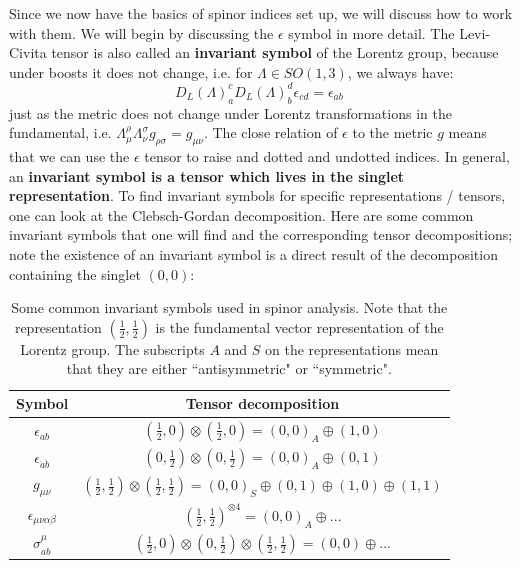 \documentclass[11pt, oneside]{article}   	%
\theoremstyle{definition}
\begin{document}
Since we now have the basics of spinor indices set up, we will discuss how to work with them. We will begin by discussing the $\epsilon$ 
symbol in more detail. The Levi-Civita tensor is also called an \textbf{invariant symbol} of the 
Lorentz group, because under boosts it does not change, i.e. for $\Lambda\in SO(1, 3)$, we always have:
\begin{equation}
	D_L(\Lambda)_a^c D_L(\Lambda)_b^d \epsilon_{cd} = \epsilon_{ab}~
	\label{eq:epsilon_trans}
\end{equation}
just as the metric does not change under Lorentz transformations in the fundamental, i.e. $\Lambda_\mu^\rho\Lambda_\nu^\sigma 
g_{\rho\sigma} = g_{\mu\nu}$. The close relation of $\epsilon$ to the metric $g$ means that we can use the $\epsilon$ tensor to raise and 
dotted and undotted indices. In general, an \textbf{invariant symbol is a tensor which lives in the singlet representation}. To find invariant 
symbols for specific representations / tensors, one can look at the Clebsch-Gordan decomposition. Here are some common invariant symbols 
that one will find and the corresponding tensor decompositions; note the existence of an invariant symbol is a direct result of the 
decomposition containing the singlet $(0, 0)$:
\begin{table}[H]
	\centering
	\begin{tabular}{| c | c | }
		\hline
		Symbol & Tensor decomposition \\
		\hline
		$\epsilon_{ab}$ & $(\frac{1}{2}, 0)\otimes (\frac{1}{2}, 0) = (0, 0)_A\oplus (1, 0)$ \\
		$\epsilon_{\dot a\dot b}$ & $(0, \frac{1}{2})\otimes (0, \frac{1}{2}) = (0, 0)_A\oplus (0, 1)$ \\
		$g_{\mu\nu}$ & $(\frac{1}{2}, \frac{1}{2})\otimes (\frac{1}{2}, \frac{1}{2}) = (0, 0)_S\oplus (0, 1)\oplus (1, 0)\oplus (1, 1)$ \\
		$\epsilon_{\mu\nu\alpha\beta}$ & $(\frac{1}{2}, \frac{1}{2})^{\otimes 4} = (0, 0)_A\oplus ...$ \\
		$\sigma_{a\dot b}^\mu$ & $(\frac{1}{2}, 0)\otimes (0, \frac{1}{2})\otimes (\frac{1}{2}, \frac{1}{2}) = (0, 0)\oplus ...$ \\
		\hline
	\end{tabular}
	\caption{Some common invariant symbols used in spinor analysis. Note that the representation $(\frac{1}{2}, \frac{1}{2})$ is the 
	fundamental vector representation of the Lorentz group. The subscripts $A$ and $S$ on the representations mean that they are either 
	``antisymmetric" or ``symmetric".}
\end{table}
\end{document}
